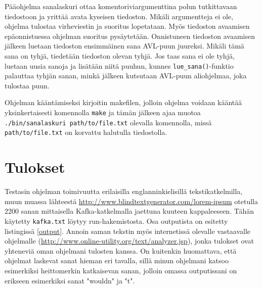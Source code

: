 \documentclass[12pt,a4paper,titlepage]{article}
\begin{document}
Pääohjelma sanalaskuri ottaa komentoriviargumenttina polun tutkittavaan tiedostoon ja yrittää avata kyseisen tiedoston. Mikäli argumentteja ei ole, ohjelma tulostaa virheviestin ja suoritus lopetataan. Myös tiedoston avaamisen epäonnistuessa ohjelman suoritus pysäytetään. Onnistuneen tiedoston avaamisen jälkeen luetaan tiedoston ensimmäinen sana AVL-puun juureksi. Mikäli tämä sana on tyhjä, tiedetään tiedoston olevan tyhjä. Jos taas sana ei ole tyhjä, luetaan uusia sanoja ja lisätään niitä puuhun, kunnes \texttt{lue\_sana()}-funktio palauttaa tyhjän sanan, minkä jälkeen kutsutaan AVL-puun aliohjelmaa, joka tulostaa puun.

Ohjelman kääntämiseksi kirjoitin makefilen, jolloin ohjelma voidaan kääntää yksinkertaisesti komennolla \texttt{make} ja tämän jälkeen ajaa muotoa \texttt{./bin/sanalaskuri path/to/file.txt} olevalla komennolla, missä \texttt{path/to/file.txt} on korvattu halutulla tiedostolla.

\section{Tulokset}
Testasin ohjelman toimivuutta erilaisilla englanninkielisillä tekstikatkelmilla, muun muassa lähteestä \url{http://www.blindtextgenerator.com/lorem-ipsum} otetulla 2200 sanan mittaisella Kafka-katkelmalla jaettuna kuuteen kappaleeseen. Tähän käytetty \texttt{kafka.txt} löytyy run-hakemistosta. Osa outputista on esitetty listingissä \ref{output}. Annoin saman tekstin myös internetissä olevalle vastaavalle ohjelmalle (\url{http://www.online-utility.org/text/analyzer.jsp}), jonka tulokset ovat yhteneviä oman ohjelmani tulosten kanssa. On kuitenkin huomattava, että ohjelmat laskevat sanat hieman eri tavalla, sillä minun ohjelmani katsoo esimerkiksi heittomerkin katkaisevan sanan, jolloin omassa outputissani on erikseen esimerkiksi sanat "wouldn" ja "t".
\end{document}
